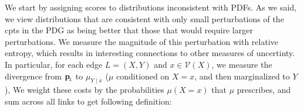 \documentclass{article}
\newcommand{\bp}[1][L]{\mat{p}_{\!_#1\!}}
\newcommand{\V}{\mathcal V}
\numberwithin{equation}{section}
\begin{document}
We start by assigning scores to distributions inconsistent with PDFs.
As we said, we view distributions that are consistent
    with only small perturbations of the cpts in the PDG as being better that
    those that would require larger perturbations.
	We measure the magnitude of this perturbation with relative
        entropy, which results in interesting connections to other
                measures of uncertinty. In particular, for each edge $L =
        (X,Y)$ and $x \in \V(X)$, we measure the
        divergence from $\bp$ to $\mu_{Y \mid x}$ ($\mu$ conditioned
        on $X=x$, and then marginalized to $Y$), 
	We weight these costs by the probabilities $\mu(X=x)$ that $\mu$ prescribes, and sum across all links to get following definition:
        
\end{document}
